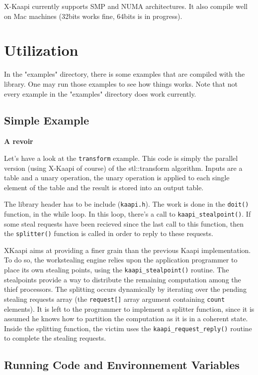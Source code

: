 \documentclass{article}
\newcommand{\kaapi}{\textsc{X}-Kaapi\xspace}
\begin{document}
\kaapi currently supports SMP and NUMA architectures. It also compile well on Mac machines (32bits works fine, 64bits is in progress).

\section{Utilization}

In the "examples" directory, there is some examples that are compiled with the library. One may run those examples to see how things works.
Note that not every example in the "examples" directory does work currently.

\subsection{Simple Example}
\textbf{A revoir}
\begin{it}
Let's have a look at the \verb+transform+ example. This code is simply the parallel version (using \kaapi  of course) of the stl::transform
algorithm. Inputs are a table and a unary operation, the unary operation is applied to each single element of the table and the result is stored into an output table.

The library header has to be include (\verb+kaapi.h+). The work is done in the \verb+doit()+ function, in the while loop. In this loop, there's a call to \verb+kaapi_stealpoint()+. If some steal requests have been recieved since the last call to this function, then the \verb+splitter()+ function is called in order to reply to these requests.

XKaapi aims at providing a finer grain than the previous Kaapi implementation. To do so, the workstealing engine relies upon the application programmer to place its own stealing points, using the \verb+kaapi_stealpoint()+ routine. The stealpoints provide a way to distribute the remaining computation among the thief processors. The splitting occurs dynamically by iterating over the pending stealing requests array (the \verb+request[]+ array argument containing \verb+count+ elements). It is left to the programmer to implement a splitter function, since it is assumed he knows how to partition the computation as it is in a coherent state. Inside the splitting function, the victim uses the \verb+kaapi_request_reply()+ routine to complete the stealing requests.
\end{it}


\subsection{Running Code and Environnement Variables}
\end{document}
